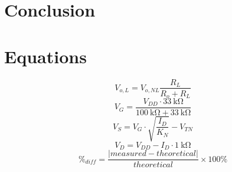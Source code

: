 \section{Conclusion}
\label{sec:conclusion}

\section{Equations}
\label{sec:equations}

%
\begin{equation}
  \label{eq:amp}
  V_{o,L} = V_{o,NL} \frac{R_L}{R_o + R_L}
\end{equation}
%
\begin{equation}
  \label{eq:V_G}
  V_G = \frac{V_{DD} \cdot \SI{33}{\kilo\ohm}}{\SI{100}{\kilo\ohm} + \SI{33}{\kilo\ohm}}
\end{equation}
%
\begin{equation}
  \label{eq:V_S}
  V_S = V_G \cdot \sqrt{\frac{I_D}{K_N}} - V_{TN}
\end{equation}
%
\begin{equation}
  \label{eq:V_D}
  V_D = V_{DD} - I_D \cdot \SI{1}{\kilo\ohm}
\end{equation}
%
\begin{equation}
  \label{eqn:percent_diff}
  \%_{diff} = \frac{|measured - theoretical|}{theoretical} \times 100\%
\end{equation}


